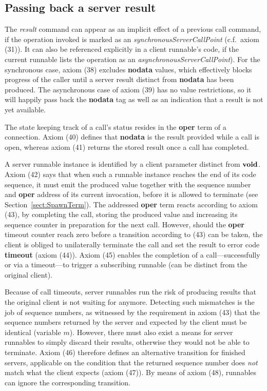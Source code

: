 \documentclass[twocolumn]{article}
\begin{document}
\subsection{Passing back a server result}

The {\em result} command can appear as an implicit effect of a previous call command, if the operation invoked is marked as an {\em synchronousServerCallPoint} (c.f.\ axiom (31)). It can also be referenced explicitly in a client runnable's code, if the current runnable lists the operation as an {\em asynchronousServerCallPoint}). For the synchronous case, axiom (38) excludes {\bf nodata} values, which effectively blocks progress of the caller until a server result distinct from {\bf nodata} has been produced. The asynchronous case of axiom (39) has no value restrictions, so it will happily pass back the {\bf nodata} tag as well as an indication that a result is not yet available.

The state keeping track of a call's status resides in the {\bf oper} term of a connection. Axiom (40) defines that {\bf nodata} is the result provided while a call is open, whereas axiom (41) returns the stored result once a call has completed. 

A server runnable instance is identified by a client parameter distinct from $\textbf{void}$. Axiom (42) says that when such a runnable instance reaches the end of its code sequence, it must emit the produced value together with the sequence number and {\bf oper} address of its current invocation, before it is allowed to terminate (see Section~\ref{sect:SpawnTerm}). The addressed {\bf oper} term reacts according to axiom (43), by completing the call, storing the produced value and increasing its sequence counter in preparation for the next call. However, should the {\bf oper} timeout counter reach zero before a transition according to (43) can be taken, the client is obliged to unilaterally terminate the call and set the result to error code {\bf timeout} (axiom (44)). Axiom (45) enables the completion of a call---successfully or via a timeout---to trigger a subscribing runnable (can be distinct from the original client).

Because of call timeouts, server runnables run the risk of producing results that the original client is not waiting for anymore. Detecting such mismatches is the job of sequence numbers, as witnessed by the requirement in axiom (43) that the sequence numbers returned by the server and expected by the client must be identical (variable $m$). However, there must also exist a means for server runnables to simply discard their results, otherwise they would not be able to terminate. Axiom (46) therefore defines an alternative transition for finished servers, applicable on the condition that the returned sequence number does {\em not} match what the client expects (axiom (47)). By means of axiom (48), runnables can ignore the corresponding transition.
\end{document}
